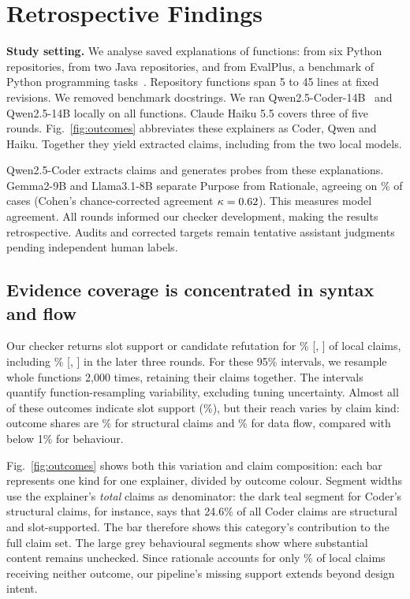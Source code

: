 \section{Retrospective Findings}\label{sec:eval}
\noindent\textbf{Study setting.} We analyse \NExplanations{} saved explanations of \NFunctions{} functions: \NFuncApy{} from six Python repositories, \NFuncAjava{} from two Java repositories, and \NFuncB{} from EvalPlus, a benchmark of Python programming tasks~\cite{liu2023evalplus}. Repository functions span 5 to 45 lines at fixed revisions. We removed benchmark docstrings. We ran Qwen2.5-Coder-14B~\cite{hui2024qwencoder} and Qwen2.5-14B locally on all functions. Claude Haiku 5.5 covers three of five rounds. Fig.~\ref{fig:outcomes} abbreviates these explainers as Coder, Qwen and Haiku. Together they yield \NClaims{} extracted claims, including \RevLocalClaims{} from the two local models.

Qwen2.5-Coder extracts claims and generates probes from these explanations. Gemma2-9B and Llama3.1-8B separate Purpose from Rationale, agreeing on \RtAgree\% of cases (Cohen's chance-corrected agreement $\kappa=0.62$). This measures model agreement. All rounds informed our checker development, making the results retrospective. Audits and corrected targets remain tentative assistant judgments pending independent human labels.

\subsection{Evidence coverage is concentrated in syntax and flow}
Our checker returns slot support or candidate refutation for \HoneFull\% [\HoneFullLo, \HoneFullHi] of local claims, including \HoneHeld\% [\HoneHeldLo, \HoneHeldHi] in the later three rounds. For these 95\% intervals, we resample whole functions 2,000 times, retaining their claims together. The intervals quantify function-resampling variability, excluding tuning uncertainty. Almost all of these outcomes indicate slot support (\DecTrueShare\%), but their reach varies by claim kind: outcome shares are \TypStructuralDec\% for structural claims and \TypDataflowDec\% for data flow, compared with below 1\% for behaviour.

Fig.~\ref{fig:outcomes} shows both this variation and claim composition: each bar represents one kind for one explainer, divided by outcome colour. Segment widths use the explainer's \emph{total} claims as denominator: the dark teal segment for Coder's structural claims, for instance, says that 24.6\% of all Coder claims are structural and slot-supported. The bar therefore shows this category's contribution to the full claim set. The large grey behavioural segments show where substantial content remains unchecked. Since rationale accounts for only \ResidRationale\% of local claims receiving neither outcome, our pipeline's missing support extends beyond design intent.


